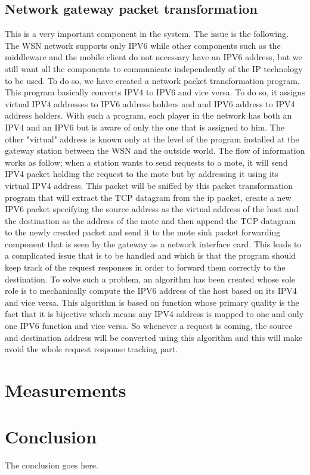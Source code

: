 \documentclass[conference]{IEEEtran}
\begin{document}
\subsection{Network gateway packet transformation}
This is a very important component in the system. The issue is the following. The WSN network supports only IPV6 while other components such as the middleware and the mobile client do not necessary have an IPV6 address, but we still want all the components to communicate independently of the IP technology to be used. To do so, we have created a network packet transformation program. This program basically converts IPV4 to IPV6 and vice versa. To do so, it assigns virtual IPV4 addresses to IPV6 address holders and and IPV6 address to IPV4 address holders. With such a program, each player in the network has both an IPV4 and an IPV6 but is aware of only the one that is assigned to him. The other "virtual" address is known only at the level of the program installed at the gateway station between the WSN and the outside world. The flow of information works as follow; when a station wants to send requests to a mote, it will send IPV4 packet holding the request to the mote but by addressing it using its virtual IPV4 address. This packet will be sniffed by this packet transformation program that will extract the TCP datagram from the ip packet, create a new IPV6 packet specifying the source address as the virtual address of the host and the destination as the address of the mote and then append the TCP datagram to the newly created packet and send it to the mote sink packet forwarding component that is seen by the gateway as a network interface card. This leads to a complicated issue that is to be handled and which is that the program should keep track of the request responses in order to forward them correctly to the destination. To solve such a problem, an algorithm has been created whose sole role is to mechanically compute the IPV6 address of the host based on its IPV4 and vice versa. This algorithm is based on function whose primary quality is the fact that it is bijective which means any IPV4 address is mapped to one and only one IPV6 function and vice versa. So whenever a request is coming, the source and destination address will be converted using this algorithm and this will make avoid the whole request response tracking part.
\section{Measurements}

\section{Conclusion}
The conclusion goes here.

\end{document}
